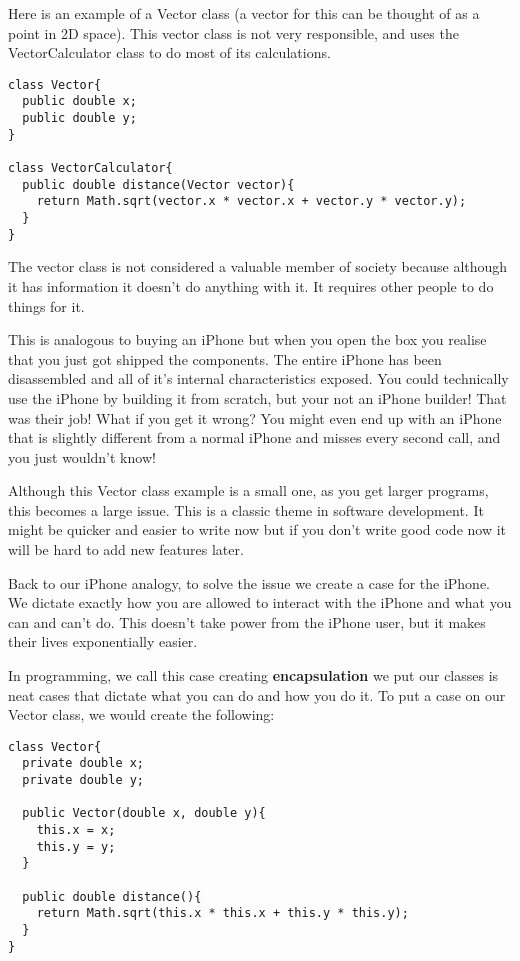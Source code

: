 \documentclass{article}
\begin{document}
  Here is an example of a Vector class (a vector for this can be thought of as
  a point in 2D space). This vector class is not very responsible, and uses
  the VectorCalculator class to do most of its calculations.

  \begin{verbatim}
class Vector{
  public double x;
  public double y;
}

class VectorCalculator{
  public double distance(Vector vector){
    return Math.sqrt(vector.x * vector.x + vector.y * vector.y);
  }
}
  \end{verbatim}

  The vector class is not considered a valuable member of society because although
  it has information it doesn't do anything with it. It requires other people
  to do things for it.

  This is analogous to buying an iPhone but when you open the box you realise
  that you just got shipped the components. The entire iPhone has been
  disassembled and all of it's internal characteristics exposed. You could
  technically use the iPhone by building it from scratch, but your not an iPhone
  builder! That was their job! What if you get it wrong? You might even end up with an iPhone that
  is slightly different from a normal iPhone and misses every second call, and
  you just wouldn't know!

  Although this Vector class example is a small one, as you get larger programs,
  this becomes a large issue. This is a classic
  theme in software development. It might be quicker and easier to write now
  but if you don't write good code now it will be hard to add new features later.

  Back to our iPhone analogy, to solve the issue we create a case for the iPhone.
  We dictate exactly how you are allowed to interact with the iPhone and what
  you can and can't do. This doesn't take power from the iPhone user, but it
  makes their lives exponentially easier.

  In programming, we call this case creating \textbf{encapsulation} we put our classes
  is neat cases that dictate what you can do and how you do it. To put a case
  on our Vector class, we would create the following:

  \begin{verbatim}
class Vector{
  private double x;
  private double y;
  
  public Vector(double x, double y){
    this.x = x;
    this.y = y;
  }

  public double distance(){
    return Math.sqrt(this.x * this.x + this.y * this.y);
  }
}
  \end{verbatim}
\end{document}
